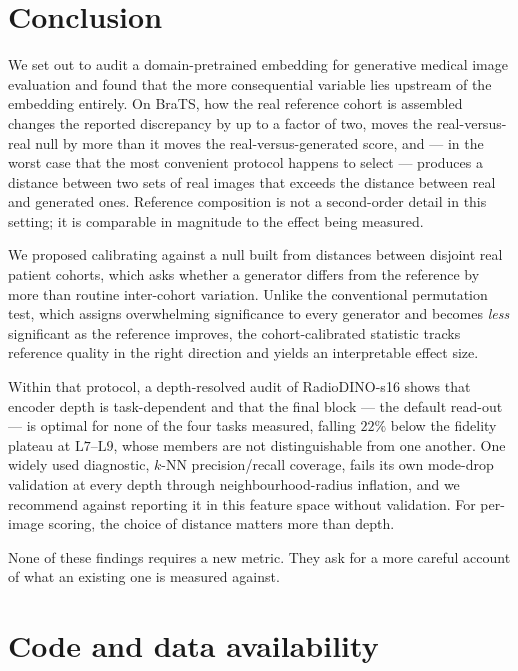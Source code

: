 \documentclass[preprint,12pt,authoryear]{elsarticle}
\newcommand{\Lb}[1]{\ensuremath{\mathrm{L}#1}}
\begin{document}
\section{Conclusion}
\label{sec:conclusion}

We set out to audit a domain-pretrained embedding for generative medical image
evaluation and found that the more consequential variable lies upstream of the
embedding entirely. On BraTS, how the real reference cohort is assembled changes
the reported discrepancy by up to a factor of two, moves the real-versus-real
null by more than it moves the real-versus-generated score, and --- in the
worst case that the most convenient protocol happens to select --- produces a
distance between two sets of real images that exceeds the distance between real
and generated ones. Reference composition is not a second-order detail in this
setting; it is comparable in magnitude to the effect being measured.

We proposed calibrating against a null built from distances between disjoint
real patient cohorts, which asks whether a generator differs from the reference
by more than routine inter-cohort variation. Unlike the conventional
permutation test, which assigns overwhelming significance to every generator and
becomes \emph{less} significant as the reference improves, the cohort-calibrated
statistic tracks reference quality in the right direction and yields an
interpretable effect size.

Within that protocol, a depth-resolved audit of RadioDINO-s16 shows that
encoder depth is task-dependent and that the final block --- the default
read-out --- is optimal for none of the four tasks measured, falling $22\%$
below the fidelity plateau at \Lb{7}--\Lb{9}, whose members are not
distinguishable from one another. One widely used diagnostic, $k$-NN
precision/recall coverage, fails its own mode-drop validation at every depth
through neighbourhood-radius inflation, and we recommend against reporting it
in this feature space without validation. For per-image scoring, the choice of
distance matters more than depth.

None of these findings requires a new metric. They ask for a more careful
account of what an existing one is measured against.

\section*{Code and data availability}
\end{document}
